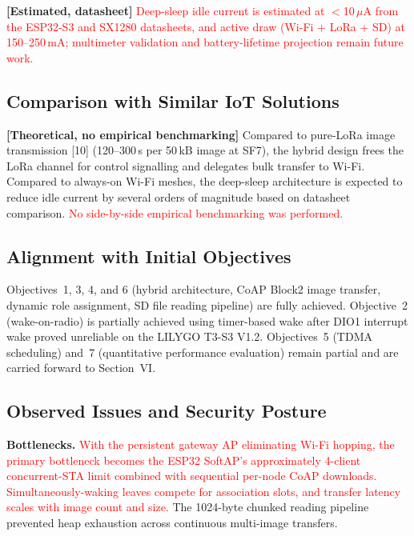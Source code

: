 \documentclass[12pt,a4paper]{article}
\newcommand{\changed}[1]{\textcolor{red}{#1}}
\begin{document}
\textbf{[Estimated, datasheet]} \changed{Deep-sleep idle current is estimated at $<$10\,$\mu$A from the ESP32-S3 and SX1280 datasheets, and active draw (Wi-Fi + LoRa + SD) at 150--250\,mA; multimeter validation and battery-lifetime projection remain future work.}

\subsection{Comparison with Similar IoT Solutions}

\textbf{[Theoretical, no empirical benchmarking]} Compared to pure-LoRa image transmission [10] (120--300\,s per 50\,kB image at SF7), the hybrid design frees the LoRa channel for control signalling and delegates bulk transfer to Wi-Fi. Compared to always-on Wi-Fi meshes, the deep-sleep architecture is expected to reduce idle current by several orders of magnitude based on datasheet comparison. \changed{No side-by-side empirical benchmarking was performed.}

\subsection{Alignment with Initial Objectives}

Objectives~1, 3, 4, and 6 (hybrid architecture, CoAP Block2 image transfer, dynamic role assignment, SD file reading pipeline) are fully achieved. Objective~2 (wake-on-radio) is partially achieved using timer-based wake after DIO1 interrupt wake proved unreliable on the LILYGO T3-S3 V1.2. Objectives~5 (TDMA scheduling) and~7 (quantitative performance evaluation) remain partial and are carried forward to Section~VI.

\subsection{Observed Issues and Security Posture}

\textbf{Bottlenecks.} \changed{With the persistent gateway AP eliminating Wi-Fi hopping, the primary bottleneck becomes the ESP32 SoftAP's approximately 4-client concurrent-STA limit combined with sequential per-node CoAP downloads. Simultaneously-waking leaves compete for association slots, and transfer latency scales with image count and size.} The 1024-byte chunked reading pipeline prevented heap exhaustion across continuous multi-image transfers.
\end{document}
